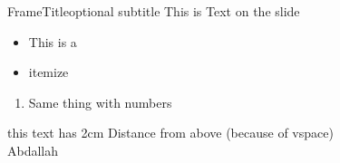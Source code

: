  
\begin{frame}[plain]{FrameTitle}{optional subtitle}
	This is Text on the slide
	\begin{itemize}
		\item This is a 
		\item itemize
	\end{itemize}
	\begin{enumerate}
		\item Same thing with numbers
	\end{enumerate}
	\vspace{2cm}
	this text has 2cm Distance from above (because of vspace)\\ %
	Abdallah
\end{frame}